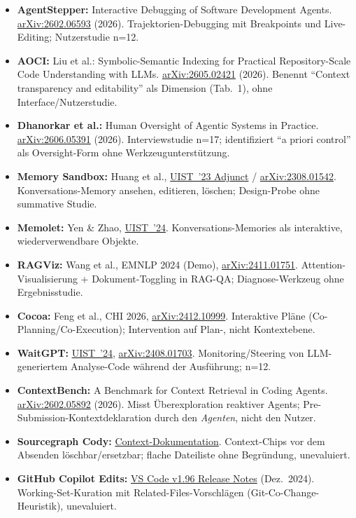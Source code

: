 \documentclass[12pt,a4paper]{scrartcl}
\begin{document}
\begin{itemize}[leftmargin=1.4em]
  \item \textbf{AgentStepper:} Interactive Debugging of Software Development Agents.
    \href{https://arxiv.org/abs/2602.06593}{arXiv:2602.06593} (2026). Trajektorien-Debugging
    mit Breakpoints und Live-Editing; Nutzerstudie n=12.
  \item \textbf{AOCI:} Liu et al.: Symbolic-Semantic Indexing for Practical Repository-Scale
    Code Understanding with LLMs. \href{https://arxiv.org/abs/2605.02421}{arXiv:2605.02421}
    (2026). Benennt \enquote{Context transparency and editability} als Dimension (Tab.~1),
    ohne Interface/Nutzerstudie.
  \item \textbf{Dhanorkar et al.:} Human Oversight of Agentic Systems in Practice.
    \href{https://arxiv.org/abs/2606.05391}{arXiv:2606.05391} (2026). Interviewstudie n=17;
    identifiziert \enquote{a priori control} als Oversight-Form ohne Werkzeugunterstützung.
  \item \textbf{Memory Sandbox:} Huang et al.,
    \href{https://dl.acm.org/doi/10.1145/3586182.3615796}{UIST~'23 Adjunct} /
    \href{https://arxiv.org/abs/2308.01542}{arXiv:2308.01542}. Konversations-Memory ansehen,
    editieren, löschen; Design-Probe ohne summative Studie.
  \item \textbf{Memolet:} Yen \& Zhao,
    \href{https://dl.acm.org/doi/10.1145/3654777.3676388}{UIST~'24}. Konversations-Memories
    als interaktive, wiederverwendbare Objekte.
  \item \textbf{RAGViz:} Wang et al., EMNLP 2024 (Demo),
    \href{https://arxiv.org/abs/2411.01751}{arXiv:2411.01751}. Attention-Visualisierung +
    Dokument-Toggling in RAG-QA; Diagnose-Werkzeug ohne Ergebnisstudie.
  \item \textbf{Cocoa:} Feng et al., CHI 2026,
    \href{https://arxiv.org/abs/2412.10999}{arXiv:2412.10999}. Interaktive Pläne
    (Co-Planning/Co-Execution); Intervention auf Plan-, nicht Kontextebene.
  \item \textbf{WaitGPT:} \href{https://dl.acm.org/doi/10.1145/3654777.3676374}{UIST~'24},
    \href{https://arxiv.org/abs/2408.01703}{arXiv:2408.01703}. Monitoring/Steering von
    LLM-generiertem Analyse-Code während der Ausführung; n=12.
  \item \textbf{ContextBench:} A Benchmark for Context Retrieval in Coding Agents.
    \href{https://arxiv.org/abs/2602.05892}{arXiv:2602.05892} (2026). Misst
    Überexploration reaktiver Agents; Pre-Submission-Kontextdeklaration durch den \emph{Agenten},
    nicht den Nutzer.
  \item \textbf{Sourcegraph Cody:}
    \href{https://sourcegraph.com/docs/cody/core-concepts/context}{Context-Dokumentation}.
    Context-Chips vor dem Absenden löschbar/ersetzbar; flache Dateiliste ohne Begründung,
    unevaluiert.
  \item \textbf{GitHub Copilot Edits:}
    \href{https://code.visualstudio.com/updates/v1_96}{VS Code v1.96 Release Notes} (Dez.~2024).
    Working-Set-Kuration mit Related-Files-Vorschlägen (Git-Co-Change-Heuristik),
    unevaluiert.
\end{itemize}
\end{document}
